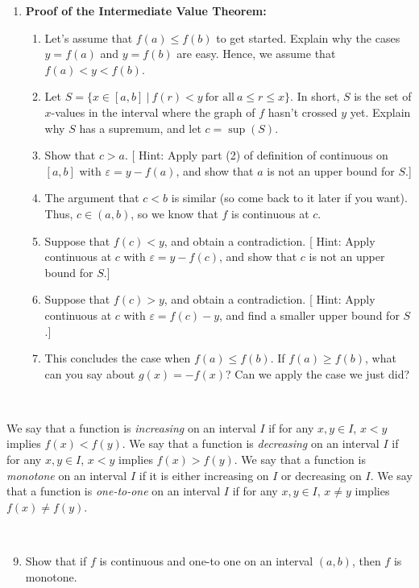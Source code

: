 \documentclass[12pt]{amsart}
\newcommand{\e}{\varepsilon}
\begin{document}
\begin{enumerate}
\

\item \textbf{Proof of the Intermediate Value Theorem:}
\begin{enumerate}
\item Let's assume that $f(a) \leq f(b)$ to get started. Explain why the cases $y=f(a)$ and $y=f(b)$ are easy. Hence, we assume that $f(a)< y < f(b)$.
\item Let $S=\{ x\in [a,b] \ | \ f(r) < y \ \text{for all} \ a\leq r \leq x \}$. In short, $S$ is the set of $x$-values in the interval where the graph of $f$ hasn't crossed $y$ yet. Explain why $S$ has a supremum, and let $c= \sup(S)$.
\item Show that $c >a$. [ Hint: Apply part (2) of definition of continuous on $[a,b]$ with $\e = y-f(a)$, and show that $a$ is not an upper bound for $S$.]
\item The argument that $c<b$ is similar (so come back to it later if you want). Thus, $c\in (a,b)$, so we know that $f$ is continuous at $c$.
\item Suppose that $f(c)<y$, and obtain a contradiction. [ Hint: Apply continuous at $c$ with $\e= y-f(c)$, and show that $c$ is not an upper bound for $S$.]
\item Suppose that $f(c)>y$, and obtain a contradiction. [ Hint: Apply continuous at $c$ with $\e= f(c)-y$, and find a smaller upper bound for $S$.]
\item This concludes the case when $f(a) \leq f(b)$. If $f(a) \geq f(b)$, what can you say about $g(x) = -f(x)$? Can we apply the case we just did?
\end{enumerate}
\end{enumerate}

\

\noindent We say that a function is \emph{increasing} on an interval $I$ if for any $x,y\in I$, $x<y$ implies $f(x)<f(y)$. We say that a function is \emph{decreasing} on an interval $I$ if for any $x,y\in I$, $x<y$ implies $f(x)>f(y)$. We say that a function is \emph{monotone} on an interval $I$ if it is either increasing on $I$ or decreasing on $I$. We say that a function is \emph{one-to-one} on an interval $I$ if for any $x,y\in I$, $x\neq y$ implies $f(x)\neq f(y)$.

\

\begin{enumerate}\setcounter{enumi}{8}
\item Show that if $f$ is continuous and one-to one on an interval $(a,b)$, then $f$ is monotone.


   \end{enumerate}
\end{document}
